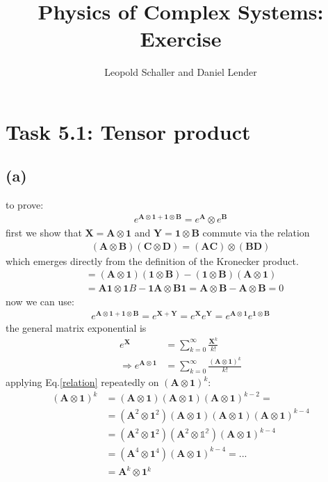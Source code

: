 \documentclass{article}
\title{Physics of Complex Systems: Exercise }
\author{Leopold Schaller and Daniel Lender}
\begin{document}
\maketitle

\section*{Task 5.1: Tensor product}
\subsection*{(a)}

to prove:
\begin{align}
    e^{\mathbf{A}\otimes \mathbf{1}+\mathbf{1}\otimes \mathbf{B}}=e^\mathbf{A}\otimes e^\mathbf{B}
\end{align}
first we show that $\mathbf{X}=\mathbf{A}\otimes \mathbf{1}$ and $\mathbf{Y}=\mathbf{1}\otimes \mathbf{B}$ commute via the relation 
\begin{align}
(\mathbf{A}\otimes \mathbf{B})(\mathbf{C}\otimes \mathbf{D})=(\mathbf{AC})\otimes (\mathbf{BD})
\label{relation}
\end{align}
which emerges directly from the definition of the Kronecker product.
\begin{align}
   [\mathbf{X},\mathbf{Y}]&=(\mathbf{A}\otimes \mathbf{1})(\mathbf{1}\otimes \mathbf{B})-(\mathbf{1}\otimes \mathbf{B})(\mathbf{A}\otimes \mathbf{1})\\
   &=\mathbf{A}\mathbf{1}\otimes\mathbf{1}B-\mathbf{1}\mathbf{A}\otimes \mathbf{B}\mathbf{1}= \mathbf{A}\otimes \mathbf{B} -\mathbf{A}\otimes \mathbf{B}=0
\end{align}
now we can use:
\begin{align}
    e^{\mathbf{A}\otimes \mathbf{1}+\mathbf{1}\otimes \mathbf{B}}=e^{\mathbf{X}+\mathbf{Y}}=e^\mathbf{X}e^\mathbf{Y}= e^{\mathbf{A}\otimes \mathbf{1}}e^{\mathbf{1}\otimes \mathbf{B}}
\end{align}
the general matrix exponential is 
\begin{align}
    e^\mathbf{X}&=\sum^\infty_{k=0}\frac{\mathbf{\mathbf{X}}^k}{k!}\\
    \Rightarrow     e^{\mathbf{A}\otimes \mathbf{1}}&=\sum^\infty_{k=0}\frac{(\mathbf{A}\otimes\mathbf{1})^k}{k!}
\end{align}
applying Eq.\ref{relation} repeatedly on $(\mathbf{A}\otimes\mathbf{1})^k$:
\begin{align}
(\mathbf{A}\otimes\mathbf{1})^k&=(\mathbf{A}\otimes\mathbf{1})(\mathbf{A}\otimes\mathbf{1})(\mathbf{A}\otimes\mathbf{1})^{k-2}=\\
    &=(\mathbf{A}^2\otimes\mathbf{1}^2)(\mathbf{A}\otimes\mathbf{1})(\mathbf{A}\otimes\mathbf{1})(\mathbf{A}\otimes\mathbf{1})^{k-4}\\
    &=(\mathbf{A}^2\otimes\mathbf{1}^2)(\mathbf{A}^2\otimes\mathbb{1^2})(\mathbf{A}\otimes\mathbf{1})^{k-4}\\
    &=(\mathbf{A}^4\otimes\mathbf{1}^4)(\mathbf{A}\otimes\mathbf{1})^{k-4}= ...\\
    &=\mathbf{A}^k\otimes\mathbf{1}^k
\end{align}
\end{document}

